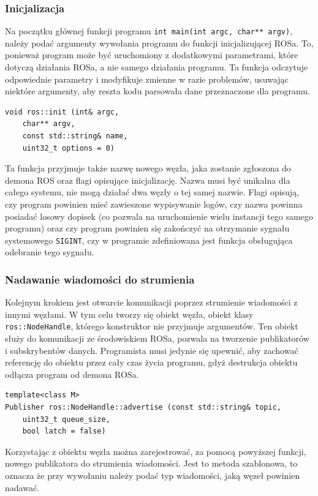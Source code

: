 		\subsubsection{Inicjalizacja}
			Na początku głównej funkcji programu \texttt{int main(int argc, char** argv)}, należy podać argumenty wywołania programu
			do funkcji inicjalizującej ROSa. To, ponieważ program może być uruchomiony z dodatkowymi parametrami, które dotyczą działania ROSa, a nie samego działania programu.
			Ta funkcja odczytuje odpowiednie parametry i modyfikuje zmienne w razie problemów, usuwając niektóre argumenty, aby reszta kodu parsowała dane przeznaczone dla programu.
			\begin{verbatim}
void ros::init (int& argc, 
	char** argv, 
	const std::string& name, 
	uint32_t options = 0)
			\end{verbatim}
			Ta funkcja przyjmuje także nazwę nowego węzła, jaka zostanie zgłoszona do demona ROS oraz flagi opisujące inicjalizację.
			Nazwa musi być unikalna dla całego systemu, nie mogą działać dwa węzły o tej samej nazwie.
			Flagi opisują, czy program powinien mieć zawieszone wypisywanie logów, czy nazwa powinna posiadać losowy dopisek (co pozwala na uruchomienie wielu instancji tego samego programu)
			oraz czy program powinien się zakończyć na otrzymanie sygnału systemowego \texttt{SIGINT}, czy w programie zdefiniowana jest funkcja obsługująca odebranie tego sygnału.
			
		\subsubsection{Nadawanie wiadomości do strumienia}
			Kolejnym krokiem jest otwarcie komunikacji poprzez strumienie wiadomości z innymi węzłami.
			W tym celu tworzy się obiekt węzła, obiekt klasy \texttt{ros::NodeHandle}, którego konstruktor nie przyjmuje argumentów.
			Ten obiekt służy do komunikacji ze środowiskiem ROSa, pozwala na tworzenie publikatorów i subskrybentów danych.
			Programista musi jedynie się upewnić, aby zachować referencję do obiektu przez cały czas życia programu, gdyż destrukcja obiektu odłącza 
			program od demona ROSa.
			\begin{verbatim}
template<class M>
Publisher ros::NodeHandle::advertise (const std::string& topic,
	uint32_t queue_size,
	bool latch = false)	
			\end{verbatim}
			Korzystając z obiektu węzła można zarejestrować, za pomocą powyższej funkcji, nowego publikatora do strumienia wiadomości.
			Jest to metoda szablonowa, to oznacza że przy wywołaniu należy podać typ wiadomości, jaką węzeł powinien nadawać.
			
